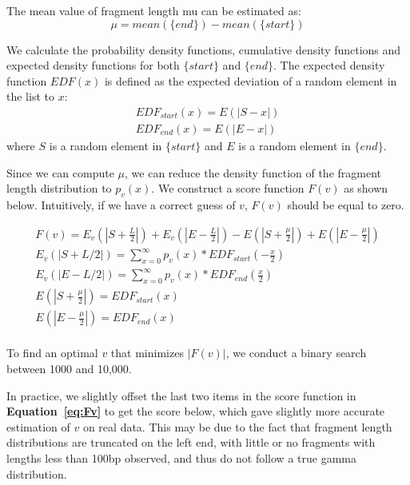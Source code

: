 \documentclass[12pt]{article}
\begin{document}
The mean value of fragment length mu can be estimated as:
\begin{equation}
  \mu = mean(\{end\}) - mean(\{start\})
\end{equation}

We calculate the probability density functions, cumulative density functions and expected density functions for both $\{start\}$ and $\{end\}$.
The expected density function $EDF(x)$ is defined as the expected deviation of a random element in the list to $x$:
\begin{equation} \label{eq:EDF}
  \begin{array}{c} 
    EDF_{start}(x) = E(|S - x|) \\
    EDF_{end}(x) = E(|E - x|)
    \end{array}
\end{equation}
where $S$ is a random element in $\{start\}$ and $E$ is a random element in $\{end\}$.

Since we can compute $\mu$, we can reduce the density function of the fragment length distribution to $p_v(x)$. %
We construct a score function $F(v)$ as shown below.
Intuitively, if we have a correct guess of $v$, $F(v)$ should be equal to zero.

\begin{equation}
  \begin{array}{c} \label{eq:Fv}
F(v) = E_v(|S + \frac{L}{2}|) + E_v(|E - \frac{L}{2}|) - E(|S + \frac{\mu}{2}|) + E(|E- \frac{\mu}{2}|) \\
E_v(|S + L/2|) = \sum_{x=0}^\infty p_v(x) * EDF_{start}(-\frac{x}{2}) \\
E_v(|E - L/2|) = \sum_{x=0}^\infty p_v(x) * EDF_{end}(\frac{x}{2}) \\
E(|S + \frac{\mu}{2}|)=EDF_{start}(x) \\
E(|E - \frac{\mu}{2}|)=EDF_{end}(x) \\
\end{array}
\end{equation}

To find an optimal $v$ that minimizes $|F(v)|$, we conduct a binary search between 1000 and 10,000.

In practice, we slightly offset the last two items in the score function in \textbf{Equation~\ref{eq:Fv}} to get the score below, which gave slightly more accurate estimation of $v$ on real data. This may be due to the fact that fragment length distributions are truncated on the left end, with little or no fragments with lengths less than 100bp observed, and thus do not follow a true gamma distribution.
\end{document}
